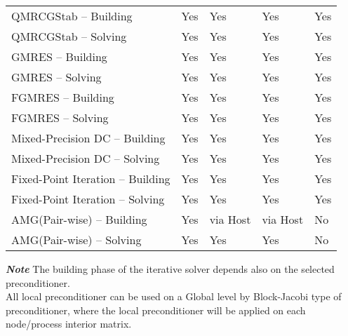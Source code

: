 \begin{table}[H]
\begin{tabular}{l|l|l|l|l}
QMRCGStab -- Building   & Yes    & Yes   & Yes     & \multicolumn{1}{l|}{Yes} \\
QMRCGStab -- Solving    & Yes    & Yes   & Yes     & \multicolumn{1}{l|}{Yes} \\ \hline

GMRES -- Building   & Yes    & Yes   & Yes     & \multicolumn{1}{l|}{Yes} \\
GMRES -- Solving    & Yes    & Yes   & Yes     & \multicolumn{1}{l|}{Yes} \\ \hline

FGMRES -- Building   & Yes    & Yes   & Yes     & \multicolumn{1}{l|}{Yes} \\
FGMRES -- Solving    & Yes    & Yes   & Yes     & \multicolumn{1}{l|}{Yes} \\ \hline

Mixed-Precision DC -- Building   & Yes    & Yes   & Yes     & \multicolumn{1}{l|}{Yes} \\
Mixed-Precision DC -- Solving    & Yes    & Yes   & Yes     & \multicolumn{1}{l|}{Yes} \\ \hline

Fixed-Point Iteration -- Building   & Yes    & Yes   & Yes     & \multicolumn{1}{l|}{Yes} \\
Fixed-Point Iteration -- Solving    & Yes    & Yes   & Yes     & \multicolumn{1}{l|}{Yes} \\ \hline

AMG(Pair-wise) -- Building   & Yes    & via Host   & via Host     & \multicolumn{1}{l|}{No} \\
AMG(Pair-wise) -- Solving    & Yes    & Yes   & Yes     & \multicolumn{1}{l|}{No} \\ \hline

\end{tabular}
\end{table}

\textbf{\emph{Note}} The building phase of the iterative solver depends also on the selected preconditioner. \\

All local preconditioner can be used on a Global level by Block-Jacobi type of preconditioner, where the local preconditioner will be applied on each node/process interior matrix.
